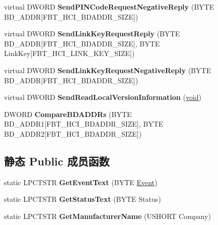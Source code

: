 \begin{DoxyCompactItemize}
\item 
\mbox{\label{class_c_hci_a76bb7bd3265296b336b3a6b24ced6f03}} 
virtual D\+W\+O\+RD {\bfseries Send\+P\+I\+N\+Code\+Request\+Negative\+Reply} (B\+Y\+TE B\+D\+\_\+\+A\+D\+DR\mbox{[}F\+B\+T\+\_\+\+H\+C\+I\+\_\+\+B\+D\+A\+D\+D\+R\+\_\+\+S\+I\+ZE\mbox{]})
\item 
\mbox{\label{class_c_hci_a4502c6a0dbb627c94b7a3d29dc79fbb6}} 
virtual D\+W\+O\+RD {\bfseries Send\+Link\+Key\+Request\+Reply} (B\+Y\+TE B\+D\+\_\+\+A\+D\+DR\mbox{[}F\+B\+T\+\_\+\+H\+C\+I\+\_\+\+B\+D\+A\+D\+D\+R\+\_\+\+S\+I\+ZE\mbox{]}, B\+Y\+TE Link\+Key\mbox{[}F\+B\+T\+\_\+\+H\+C\+I\+\_\+\+L\+I\+N\+K\+\_\+\+K\+E\+Y\+\_\+\+S\+I\+ZE\mbox{]})
\item 
\mbox{\label{class_c_hci_a8cd0354d3d557ef333a4814bf84cd314}} 
virtual D\+W\+O\+RD {\bfseries Send\+Link\+Key\+Request\+Negative\+Reply} (B\+Y\+TE B\+D\+\_\+\+A\+D\+DR\mbox{[}F\+B\+T\+\_\+\+H\+C\+I\+\_\+\+B\+D\+A\+D\+D\+R\+\_\+\+S\+I\+ZE\mbox{]})
\item 
\mbox{\label{class_c_hci_a9ee011f808bb7b9897f0451bd08a0b13}} 
virtual D\+W\+O\+RD {\bfseries Send\+Read\+Local\+Version\+Information} (\hyperlink{interfacevoid}{void})
\item 
\mbox{\label{class_c_hci_a7432749b2e8e52862558eb855346e437}} 
D\+W\+O\+RD {\bfseries Compare\+B\+D\+A\+D\+D\+Rs} (B\+Y\+TE B\+D\+\_\+\+A\+D\+D\+R1\mbox{[}F\+B\+T\+\_\+\+H\+C\+I\+\_\+\+B\+D\+A\+D\+D\+R\+\_\+\+S\+I\+ZE\mbox{]}, B\+Y\+TE B\+D\+\_\+\+A\+D\+D\+R2\mbox{[}F\+B\+T\+\_\+\+H\+C\+I\+\_\+\+B\+D\+A\+D\+D\+R\+\_\+\+S\+I\+ZE\mbox{]})
\end{DoxyCompactItemize}
\subsection*{静态 Public 成员函数}
\begin{DoxyCompactItemize}
\item 
\mbox{\label{class_c_hci_aa43095ff3d49124347184aec9fba74a7}} 
static L\+P\+C\+T\+S\+TR {\bfseries Get\+Event\+Text} (B\+Y\+TE \hyperlink{struct_event}{Event})
\item 
\mbox{\label{class_c_hci_a74865dea05f781e40a01939642663712}} 
static L\+P\+C\+T\+S\+TR {\bfseries Get\+Status\+Text} (B\+Y\+TE Status)
\item 
\mbox{\label{class_c_hci_aef574826467070e2df1728aa79f31b78}} 
static L\+P\+C\+T\+S\+TR {\bfseries Get\+Manufacturer\+Name} (U\+S\+H\+O\+RT Company)
\end{DoxyCompactItemize}
